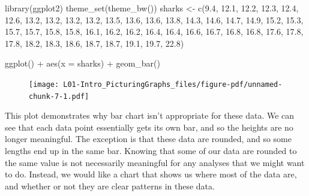 \documentclass[
  letterpaper,
  DIV=11,
  numbers=noendperiod]{scrreprt}
\newenvironment{Shaded}{\begin{snugshade}}{\end{snugshade}}
\newcommand{\AttributeTok}[1]{\textcolor[rgb]{0.40,0.45,0.13}{#1}}
\newcommand{\FloatTok}[1]{\textcolor[rgb]{0.68,0.00,0.00}{#1}}
\newcommand{\FunctionTok}[1]{\textcolor[rgb]{0.28,0.35,0.67}{#1}}
\newcommand{\NormalTok}[1]{\textcolor[rgb]{0.00,0.23,0.31}{#1}}
\newcommand{\OtherTok}[1]{\textcolor[rgb]{0.00,0.23,0.31}{#1}}
\newcommand{\SpecialCharTok}[1]{\textcolor[rgb]{0.37,0.37,0.37}{#1}}
\begin{document}
\begin{Shaded}
\begin{Highlighting}[]
\FunctionTok{library}\NormalTok{(ggplot2)}
\FunctionTok{theme\_set}\NormalTok{(}\FunctionTok{theme\_bw}\NormalTok{())}
\NormalTok{sharks }\OtherTok{\textless{}{-}}  \FunctionTok{c}\NormalTok{(}\FloatTok{9.4}\NormalTok{, }\FloatTok{12.1}\NormalTok{, }\FloatTok{12.2}\NormalTok{, }\FloatTok{12.3}\NormalTok{, }\FloatTok{12.4}\NormalTok{, }\FloatTok{12.6}\NormalTok{, }\FloatTok{13.2}\NormalTok{, }\FloatTok{13.2}\NormalTok{, }\FloatTok{13.2}\NormalTok{, }\FloatTok{13.2}\NormalTok{, }\FloatTok{13.5}\NormalTok{,}
\FloatTok{13.6}\NormalTok{, }\FloatTok{13.6}\NormalTok{, }\FloatTok{13.8}\NormalTok{, }\FloatTok{14.3}\NormalTok{, }\FloatTok{14.6}\NormalTok{, }\FloatTok{14.7}\NormalTok{, }\FloatTok{14.9}\NormalTok{, }\FloatTok{15.2}\NormalTok{, }\FloatTok{15.3}\NormalTok{, }\FloatTok{15.7}\NormalTok{, }\FloatTok{15.7}\NormalTok{,}
\FloatTok{15.8}\NormalTok{, }\FloatTok{15.8}\NormalTok{, }\FloatTok{16.1}\NormalTok{, }\FloatTok{16.2}\NormalTok{, }\FloatTok{16.2}\NormalTok{, }\FloatTok{16.4}\NormalTok{, }\FloatTok{16.4}\NormalTok{, }\FloatTok{16.6}\NormalTok{, }\FloatTok{16.7}\NormalTok{, }\FloatTok{16.8}\NormalTok{, }\FloatTok{16.8}\NormalTok{,}
\FloatTok{17.6}\NormalTok{, }\FloatTok{17.8}\NormalTok{, }\FloatTok{17.8}\NormalTok{, }\FloatTok{18.2}\NormalTok{, }\FloatTok{18.3}\NormalTok{, }\FloatTok{18.6}\NormalTok{, }\FloatTok{18.7}\NormalTok{, }\FloatTok{18.7}\NormalTok{, }\FloatTok{19.1}\NormalTok{, }\FloatTok{19.7}\NormalTok{, }\FloatTok{22.8}\NormalTok{)}

\FunctionTok{ggplot}\NormalTok{() }\SpecialCharTok{+} \FunctionTok{aes}\NormalTok{(}\AttributeTok{x =}\NormalTok{ sharks) }\SpecialCharTok{+} \FunctionTok{geom\_bar}\NormalTok{()}
\end{Highlighting}
\end{Shaded}

\begin{figure}[H]

{\centering \texttt{[image: L01-Intro\_PicturingGraphs\_files/figure-pdf/unnamed-chunk-7-1.pdf]}

}

\end{figure}

This plot demonstrates why bar chart isn't appropriate for these data.
We can see that each data point essentially gets its own bar, and so the
heights are no longer meaningful. The exception is that these data are
rounded, and so some lengths end up in the same bar. Knowing that some
of our data are rounded to the same value is not necessarily meaningful
for any analyses that we might want to do. Instead, we would like a
chart that shows us where most of the data are, and whether or not they
are clear patterns in these data.
\end{document}
